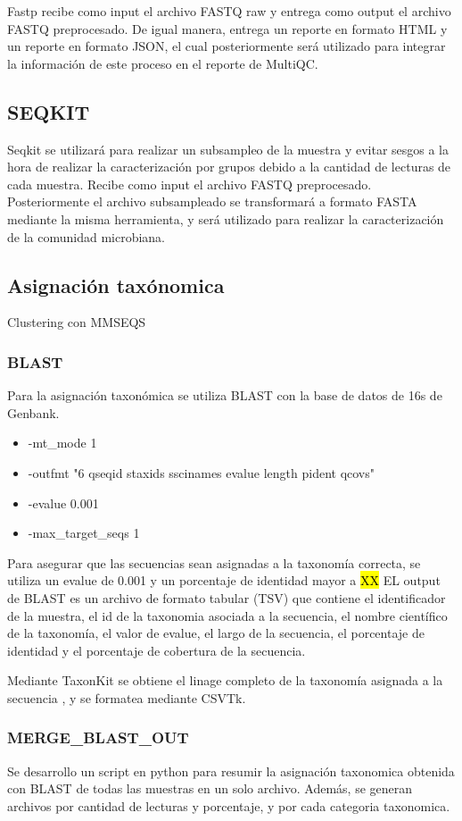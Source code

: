 \begin{itemize}
Fastp recibe como input el archivo FASTQ raw y entrega como output el archivo FASTQ preprocesado. De igual manera, entrega un reporte en formato HTML y un reporte en formato JSON, el cual posteriormente será utilizado para integrar la información de este proceso en el reporte de MultiQC.

\subsection{SEQKIT}
Seqkit se utilizará para realizar un subsampleo de la muestra y evitar sesgos a la hora de realizar la caracterización por grupos debido a la cantidad de lecturas de cada muestra. Recibe como input el archivo FASTQ preprocesado.
Posteriormente el archivo subsampleado se transformará a formato FASTA mediante la misma herramienta, y será utilizado para realizar la caracterización de la comunidad microbiana.



\subsection{Asignación taxónomica}
Clustering con MMSEQS
\subsubsection{BLAST}
Para la asignación taxonómica se utiliza BLAST con la base de datos de 16s de Genbank.
\begin{itemize}
    \item -mt\_mode 1
    \item -outfmt "6 qseqid staxids sscinames evalue length pident qcovs"
    \item -evalue 0.001
    \item -max\_target\_seqs 1
\end{itemize}
Para asegurar que las secuencias sean asignadas a la taxonomía correcta, se utiliza un evalue de 0.001 y un porcentaje de identidad mayor a \hl{XX}
EL output de BLAST es un archivo de formato tabular (TSV) que contiene el identificador de la muestra, el id de la taxonomia asociada a la secuencia, el nombre científico de la taxonomía, el valor de evalue, el largo de la secuencia, el porcentaje de identidad y el porcentaje de cobertura de la secuencia.

Mediante TaxonKit se obtiene el linage completo de la taxonomía asignada a la secuencia , y se formatea mediante CSVTk.

\subsubsection{MERGE\_BLAST\_OUT}
Se desarrollo un script en python para resumir la asignación taxonomica obtenida con BLAST de todas las muestras en un solo archivo. Además, se generan archivos por cantidad de lecturas y porcentaje, y por cada categoria taxonomica.


\end{itemize}
